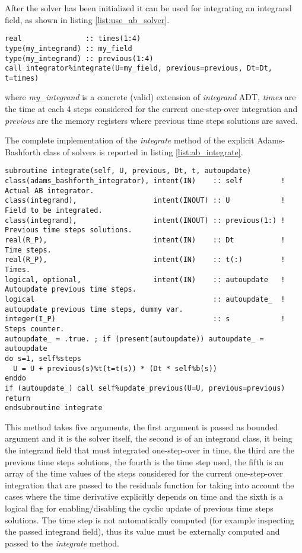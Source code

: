 After the solver has been initialized it can be used for integrating an integrand field, as shown in listing \ref{list:use_ab_solver}.

\begin{lstlisting}[firstnumber=1,style=code,caption={example of usage of an Adams-Bashforth integrator},label={list:use_ab_solver}]
real               :: times(1:4)
type(my_integrand) :: my_field
type(my_integrand) :: previous(1:4)
call integrator%integrate(U=my_field, previous=previous, Dt=Dt, t=times)
\end{lstlisting}
where \emph{my\_integrand} is a concrete (valid) extension of \emph{integrand} ADT, \emph{times} are the time at each 4 steps considered for the current one-step-over integration and \emph{previous} are the memory registers where previous time steps solutions are saved.

The complete implementation of the \emph{integrate} method of the explicit Adams-Bashforth class of solvers is reported in listing \ref{list:ab_integrate}.

\begin{lstlisting}[firstnumber=1,style=code,caption={implementation of the \emph{integrate} method of explicit Adams-Bashforth class},label={list:ab_integrate}]
subroutine integrate(self, U, previous, Dt, t, autoupdate)
class(adams_bashforth_integrator), intent(IN)    :: self         ! Actual AB integrator.
class(integrand),                  intent(INOUT) :: U            ! Field to be integrated.
class(integrand),                  intent(INOUT) :: previous(1:) ! Previous time steps solutions.
real(R_P),                         intent(IN)    :: Dt           ! Time steps.
real(R_P),                         intent(IN)    :: t(:)         ! Times.
logical, optional,                 intent(IN)    :: autoupdate   ! Autoupdate previous time steps.
logical                                          :: autoupdate_  ! autoupdate previous time steps, dummy var.
integer(I_P)                                     :: s            ! Steps counter.
autoupdate_ = .true. ; if (present(autoupdate)) autoupdate_ = autoupdate
do s=1, self%steps
  U = U + previous(s)%t(t=t(s)) * (Dt * self%b(s))
enddo
if (autoupdate_) call self%update_previous(U=U, previous=previous)
return
endsubroutine integrate
\end{lstlisting}

This method takes five arguments, the first argument is passed as bounded argument and it is the solver itself, the second is of an integrand class, it being the integrand field that must integrated one-step-over in time, the third are the previous time steps solutions, the fourth is the time step used, the fifth is an array of the time values of the steps considered for the current one-step-over integration that are passed to the residuals function for taking into account the cases where the time derivative explicitly depends on time and the sixth is a logical flag for enabling/disabling the cyclic update of previous time steps solutions. The time step is not automatically computed (for example inspecting the passed integrand field), thus its value must be externally computed and passed to the \emph{integrate} method.

